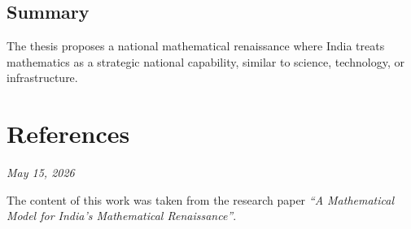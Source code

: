 \documentclass[12pt,a4paper]{article}
\begin{document}
\subsection{Summary}
The thesis proposes a national mathematical renaissance where India treats mathematics as a strategic national capability, similar to science, technology, or infrastructure.

\newpage

\section{References}
\textit{May 15, 2026}

The content of this work was taken from the research paper \textit{“A Mathematical Model for India’s Mathematical Renaissance”}.
\end{document}
